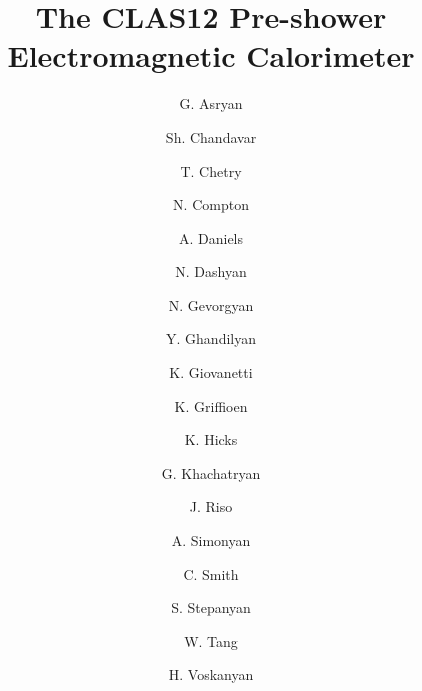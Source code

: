 \title{The CLAS12 Pre-shower Electromagnetic Calorimeter}

\author[YerPi]{G. Asryan}
\author[Ohio]{Sh. Chandavar}
\author[Ohio]{T. Chetry}
\author[Ohio]{N. Compton}
\author[Ohio]{A. Daniels}
\author[YerPi]{N. Dashyan}
\author[YerPi]{N. Gevorgyan}
\author[YerPi]{Y. Ghandilyan}
\author[JMU]{K. Giovanetti}
\author[WmM]{K. Griffioen}
\author[Ohio]{K. Hicks}
\author[YerPi]{G. Khachatryan}
\author[WmM]{J. Riso}
\author[YerPi]{A. Simonyan}
\author[UVA]{C. Smith}
\author[JLAB]{S. Stepanyan}
\author[Ohio]{W. Tang}
\author[YerPi]{H. Voskanyan}

\address[JLAB]{Thomas Jefferson National Accelerator Facility, 
Newport News, VA 23606, USA}
\address[WmM]{The College of William and Mary, Williamsburg, VA 23185, USA}
\address[Ohio]{Ohio University, Athens, OH 4570, USA} 
\address[UVA]{University of Virginia, Charlottesville, VA 22901, USA}
\address[YerPi]{A. Alikhanyan National Science Laboratory,  Yerevan, 375036, Armenia}
\address[JMU]{James Madison University, Harrisonburg, VA , USA}

